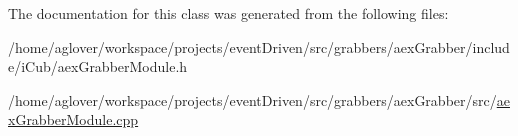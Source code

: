The documentation for this class was generated from the following files\-:\begin{DoxyCompactItemize}
\item 
/home/aglover/workspace/projects/event\-Driven/src/grabbers/aex\-Grabber/include/i\-Cub/aex\-Grabber\-Module.\-h\item 
/home/aglover/workspace/projects/event\-Driven/src/grabbers/aex\-Grabber/src/\hyperlink{aexGrabberModule_8cpp}{aex\-Grabber\-Module.\-cpp}\end{DoxyCompactItemize}
